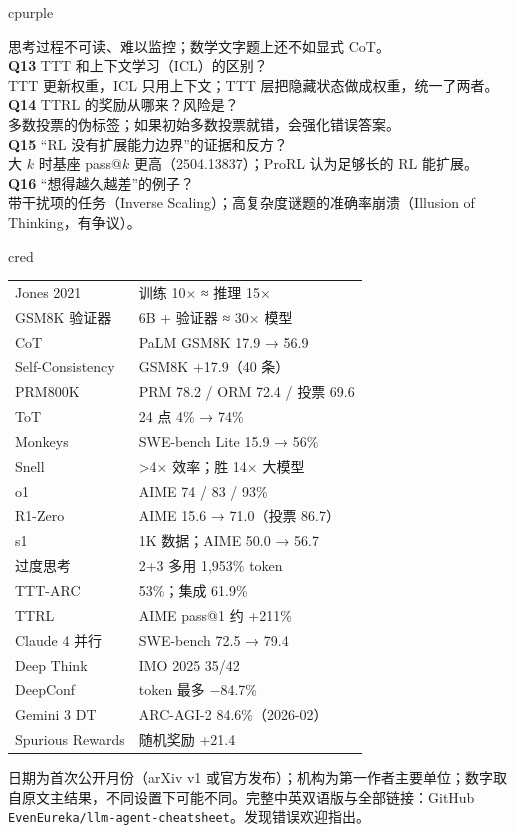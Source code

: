 \documentclass[8pt]{extarticle}
\begin{document}
\begin{minipage}[t]{0.625\linewidth}
\begin{tbox}[title={自测：看完应该能回答（16 问）}]{cpurple}
\begin{multicols}{2}
思考过程不可读、难以监控；数学文字题上还不如显式 CoT。\\[1pt]
\textbf{Q13} TTT 和上下文学习（ICL）的区别？\\
TTT 更新权重，ICL 只用上下文；TTT 层把隐藏状态做成权重，统一了两者。\\[1pt]
\textbf{Q14} TTRL 的奖励从哪来？风险是？\\
多数投票的伪标签；如果初始多数投票就错，会强化错误答案。\\[1pt]
\textbf{Q15} “RL 没有扩展能力边界”的证据和反方？\\
大 $k$ 时基座 pass@$k$ 更高（2504.13837）；ProRL 认为足够长的 RL 能扩展。\\[1pt]
\textbf{Q16} “想得越久越差”的例子？\\
带干扰项的任务（Inverse Scaling）；高复杂度谜题的准确率崩溃（Illusion of Thinking，有争议）。
\end{multicols}
\end{tbox}
\end{minipage}\hfill
\begin{minipage}[t]{0.365\linewidth}\vspace{0pt}
\begin{tbox}[title={关键数字速记}]{cred}\normalsize\renewcommand{\arraystretch}{1.1}
\begin{tabularx}{\linewidth}{@{}l Y@{}}
\toprule
Jones 2021 & 训练 10× ≈ 推理 15×\\
GSM8K 验证器 & 6B + 验证器 ≈ 30× 模型\\
CoT & PaLM GSM8K 17.9 → 56.9\\
Self-Consistency & GSM8K +17.9（40 条）\\
PRM800K & PRM 78.2 / ORM 72.4 / 投票 69.6\\
ToT & 24 点 4\% → 74\%\\
Monkeys & SWE-bench Lite 15.9 → 56\%\\
Snell & >4× 效率；胜 14× 大模型\\
o1 & AIME 74 / 83 / 93\%\\
R1-Zero & AIME 15.6 → 71.0（投票 86.7）\\
s1 & 1K 数据；AIME 50.0 → 56.7\\
过度思考 & 2+3 多用 1,953\% token\\
TTT-ARC & 53\%；集成 61.9\%\\
TTRL & AIME pass@1 约 +211\%\\
Claude 4 并行 & SWE-bench 72.5 → 79.4\\
Deep Think & IMO 2025 35/42\\
DeepConf & token 最多 −84.7\%\\
Gemini 3 DT & ARC-AGI-2 84.6\%（2026-02）\\
Spurious Rewards & 随机奖励 +21.4\\
\bottomrule
\end{tabularx}
\end{tbox}
\end{minipage}

\vfill
{\scriptsize\color{cgray}日期为首次公开月份（arXiv v1 或官方发布）；机构为第一作者主要单位；数字取自原文主结果，不同设置下可能不同。完整中英双语版与全部链接：GitHub \texttt{EvenEureka/llm-agent-cheatsheet}。发现错误欢迎指出。}
\end{document}
